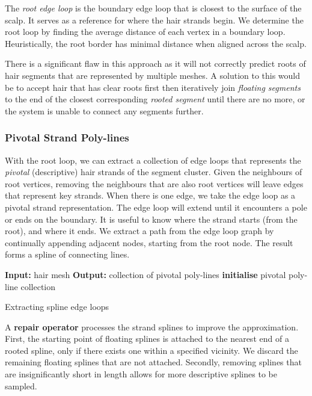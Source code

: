 \documentclass[ %
author={Dillon Keith Diep},
supervisor={Dr. Carl Henrik Ek},
degree={MEng},
title={ART-CG:},
subtitle={Assisted Real-time Content Generation of 3D Hair by Learning Manifolds},
type={Research},
year={2017} ]{dissertation}
\begin{document}
The \textit{root edge loop} is the boundary edge loop that is closest to the surface of the scalp. It serves as a reference for where the hair strands begin. We determine the root loop by finding the average distance of each vertex in a boundary loop. Heuristically, the root border has minimal distance when aligned across the scalp.

There is a significant flaw in this approach as it will not correctly predict roots of hair segments that are represented by multiple meshes. A solution to this would be to accept hair that has clear roots first then iteratively join \textit{floating segments} to the end of the closest corresponding \textit{rooted segment} until there are no more, or the system is unable to connect any segments further.	

\subsubsection{Pivotal Strand Poly-lines}
With the root loop, we can extract a collection of edge loops that represents the \textit{pivotal} (descriptive) hair strands of the segment cluster. Given the neighbours of root vertices, removing the neighbours that are also root vertices will leave edges that represent key strands. When there is one edge, we take the edge loop as a pivotal strand representation. The edge loop will extend until it encounters a pole or ends on the boundary. It is useful to know where the strand starts (from the root), and where it ends. We extract a path from the edge loop graph by continually appending adjacent nodes, starting from the root node. The result forms a spline of connecting lines.

\begin{algorithm}[!h]
	\algrule
	\textbf{Input:} hair mesh\;
	\textbf{Output:} collection of pivotal poly-lines\;
	\algrule
	\textbf{initialise}\;
	\Return pivotal poly-line collection\;
	\caption{Extracting spline edge loops}
\end{algorithm}

A \textbf{repair operator} processes the strand splines to improve the approximation. First, the starting point of floating splines is attached to the nearest end of a rooted spline, only if there exists one within a specified vicinity. We discard the remaining floating splines that are not attached. Secondly, removing splines that are insignificantly short in length allows for more descriptive splines to be sampled.
\end{document}
